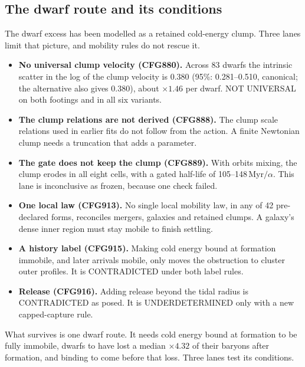 \documentclass[10pt]{article}
\begin{document}
\subsection{The dwarf route and its conditions}
The dwarf excess has been modelled as a retained cold-energy clump. Three lanes limit that picture, and mobility rules do not rescue it.
\begin{itemize}
\item \textbf{No universal clump velocity (CFG880).} Across 83 dwarfs the intrinsic scatter in the log of the clump velocity is 0.380 (95\%: 0.281--0.510, canonical; the alternative also gives 0.380), about $\times1.46$ per dwarf. NOT UNIVERSAL on both footings and in all six variants.
\item \textbf{The clump relations are not derived (CFG888).} The clump scale relations used in earlier fits do not follow from the action. A finite Newtonian clump needs a truncation that adds a parameter.
\item \textbf{The gate does not keep the clump (CFG889).} With orbits mixing, the clump erodes in all eight cells, with a gated half-life of 105--148\,Myr$/\alpha$. This lane is inconclusive as frozen, because one check failed.
\item \textbf{One local law (CFG913).} No single local mobility law, in any of 42 pre-declared forms, reconciles mergers, galaxies and retained clumps. A galaxy's dense inner region must stay mobile to finish settling.
\item \textbf{A history label (CFG915).} Making cold energy bound at formation immobile, and later arrivals mobile, only moves the obstruction to cluster outer profiles. It is CONTRADICTED under both label rules.
\item \textbf{Release (CFG916).} Adding release beyond the tidal radius is CONTRADICTED as posed. It is UNDERDETERMINED only with a new capped-capture rule.
\end{itemize}
What survives is one dwarf route. It needs cold energy bound at formation to be fully immobile, dwarfs to have lost a median $\times4.32$ of their baryons after formation, and binding to come before that loss. Three lanes test its conditions.
\end{document}
